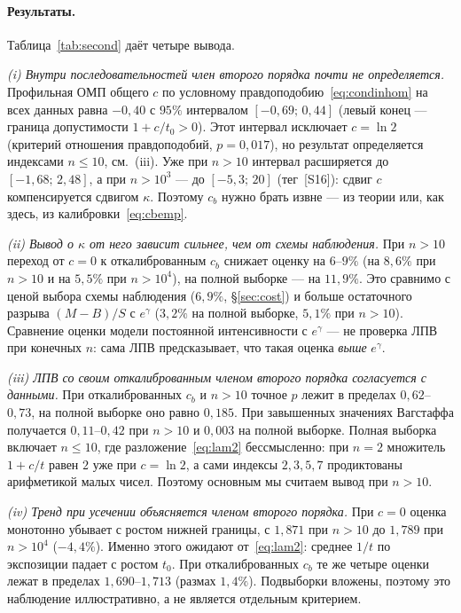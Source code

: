 \documentclass[11pt,a4paper]{article}
\theoremstyle{plain}
\theoremstyle{remark}
\newcommand{\eg}{e^{\gamma}}
\begin{document}
\paragraph{Результаты.} Таблица~\ref{tab:second} даёт четыре вывода.

\emph{(i) Внутри последовательностей член второго порядка почти не
определяется.} Профильная ОМП общего $c$ по условному
правдоподобию~\eqref{eq:condinhom} на всех данных равна $-0{,}40$ с $95\%$
интервалом $[-0{,}69;\,0{,}44]$ (левый конец --- граница допустимости
$1+c/t_0>0$). Этот интервал исключает $c=\ln2$ (критерий отношения
правдоподобий, $p=0{,}017$), но результат определяется индексами $n\le10$,
см.~(iii). Уже при $n>10$ интервал расширяется до $[-1{,}68;\,2{,}48]$, а при
$n>10^3$ --- до $[-5{,}3;\,20]$ (тег~[S16]): сдвиг $c$ компенсируется сдвигом
$\kappa$. Поэтому $c_b$ нужно брать извне --- из теории или, как здесь, из
калибровки~\eqref{eq:cbemp}.

\emph{(ii) Вывод о $\kappa$ от него зависит сильнее, чем от схемы наблюдения.}
При $n>10$ переход от $c=0$ к откалиброванным $c_b$ снижает оценку на $6$--$9\%$ (на
$8{,}6\%$ при $n>10$ и на $5{,}5\%$ при $n>10^4$), на полной выборке --- на
$11{,}9\%$. Это сравнимо с ценой выбора схемы наблюдения ($6{,}9\%$,
\S\ref{sec:cost}) и больше остаточного разрыва $(M-B)/S$ с $\eg$ ($3{,}2\%$ на
полной выборке, $5{,}1\%$ при $n>10$). Сравнение оценки модели постоянной
интенсивности с $\eg$ --- не проверка ЛПВ при конечных $n$: сама ЛПВ предсказывает,
что такая оценка \emph{выше} $\eg$.

\emph{(iii) ЛПВ со своим откалиброванным членом второго порядка согласуется с
данными.} При откалиброванных $c_b$ и $n>10$ точное $p$ лежит в пределах
$0{,}62$--$0{,}73$, на полной выборке оно равно $0{,}185$. При завышенных
значениях Вагстаффа получается $0{,}11$--$0{,}42$ при $n>10$ и $0{,}003$ на полной
выборке. Полная выборка включает $n\le10$, где разложение~\eqref{eq:lam2}
бессмысленно: при $n=2$ множитель $1+c/t$ равен $2$ уже при $c=\ln2$, а сами
индексы $2,3,5,7$ продиктованы арифметикой малых чисел. Поэтому основным мы
считаем вывод при $n>10$.

\emph{(iv) Тренд при усечении объясняется членом второго порядка.} При $c=0$
оценка монотонно убывает с ростом нижней границы, с $1{,}871$ при $n>10$ до
$1{,}789$ при $n>10^4$ ($-4{,}4\%$). Именно этого ожидают от~\eqref{eq:lam2}:
среднее $1/t$ по экспозиции падает с ростом $t_0$. При откалиброванных $c_b$ те же
четыре оценки лежат в пределах $1{,}690$--$1{,}713$ (размах $1{,}4\%$). Подвыборки
вложены, поэтому это наблюдение иллюстративно, а не является отдельным критерием.
\end{document}
